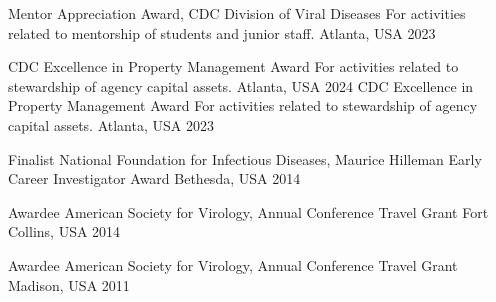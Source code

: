 \begin{cvhonors}
  \cvhonor
    {Mentor Appreciation Award, CDC Division of Viral Diseases} %
    {For activities related to mentorship of students and junior staff.} %
    {Atlanta, USA} %
    {2023} %

  \cvhonor
    {CDC Excellence in Property Management Award} %
    {For activities related to stewardship of agency capital assets.} %
    {Atlanta, USA} %
    {2024} %
  \cvhonor
    {CDC Excellence in Property Management Award} %
    {For activities related to stewardship of agency capital assets.} %
    {Atlanta, USA} %
    {2023} %

\end{cvhonors}




\begin{cvhonors}

  \cvhonor
    {Finalist} %
    {National Foundation for Infectious Diseases, Maurice Hilleman Early Career Investigator Award} %
    {Bethesda, USA} %
    {2014} %

  \cvhonor
    {Awardee} %
    {American Society for Virology, Annual Conference Travel Grant} %
    {Fort Collins, USA} %
    {2014} %

  \cvhonor
    {Awardee} %
    {American Society for Virology, Annual Conference Travel Grant} %
    {Madison, USA} %
    {2011} %

\end{cvhonors}



